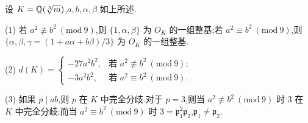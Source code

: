 \begin{theorem}\label{thm:2.11}
设 $K=\mathbb{Q}(\sqrt[3]{m})$,$a,b,\alpha,\beta$ 如上所述.

(1) 若 $a^2\not\equiv b^2\ (\mathrm{mod}\ 9)$,则 $\{1,\alpha,\beta\}$ 为 $O_K$ 的一组整基;若 $a^2\equiv b^2\ (\mathrm{mod}\ 9)$,则 $\{\alpha,\beta,\gamma=(1+a\alpha+b\beta)/3\}$ 为 $O_K$ 的一组整基.

(2) $d(K)=\begin{cases}-27a^2b^2, & \text{若 } a^2\not\equiv b^2\ (\mathrm{mod}\ 9);\\ -3a^2b^2, & \text{若 } a^2\equiv b^2\ (\mathrm{mod}\ 9).\end{cases}$

(3) 如果 $p\mid ab$,则 $p$ 在 $K$ 中完全分歧.对于 $p=3$,则当 $a^2\not\equiv b^2\ (\mathrm{mod}\ 9)$ 时 $3$ 在 $K$ 中完全分歧;而当 $a^2\equiv b^2\ (\mathrm{mod}\ 9)$ 时 $3=\mathfrak{p}_1^2\mathfrak{p}_2$,$\mathfrak{p}_1\neq\mathfrak{p}_2$.
\end{theorem}

